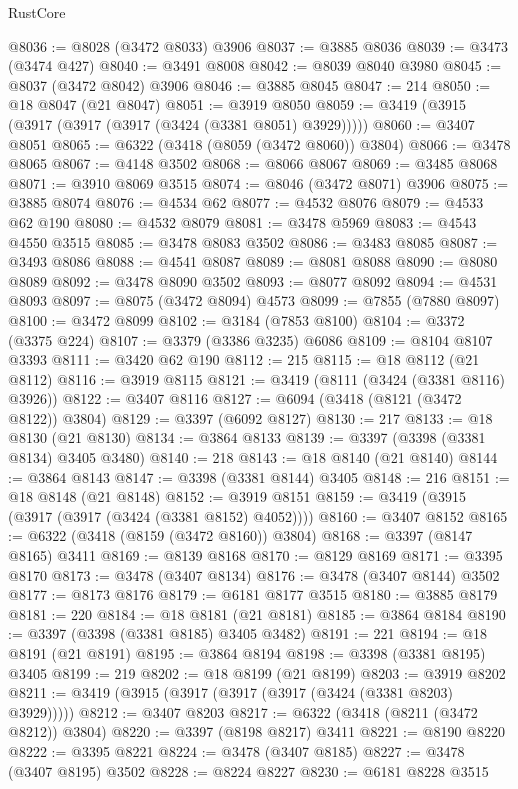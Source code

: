 \begin{lexlean}{RustCore}
\begin{coremodule}
@8036 := @8028 (@3472 @8033) @3906
@8037 := @3885 @8036
@8039 := @3473 (@3474 @427)
@8040 := @3491 @8008
@8042 := @8039 @8040 @3980
@8045 := @8037 (@3472 @8042) @3906
@8046 := @3885 @8045
@8047 := 214
@8050 := @18 @8047 (@21 @8047)
@8051 := @3919 @8050
@8059 := @3419 (@3915 (@3917 (@3917 (@3917 (@3424 (@3381 @8051) @3929)))))
@8060 := @3407 @8051
@8065 := @6322 (@3418 (@8059 (@3472 @8060)) @3804)
@8066 := @3478 @8065
@8067 := @4148 @3502
@8068 := @8066 @8067
@8069 := @3485 @8068
@8071 := @3910 @8069 @3515
@8074 := @8046 (@3472 @8071) @3906
@8075 := @3885 @8074
@8076 := @4534 @62
@8077 := @4532 @8076
@8079 := @4533 @62 @190
@8080 := @4532 @8079
@8081 := @3478 @5969
@8083 := @4543 @4550 @3515
@8085 := @3478 @8083 @3502
@8086 := @3483 @8085
@8087 := @3493 @8086
@8088 := @4541 @8087
@8089 := @8081 @8088
@8090 := @8080 @8089
@8092 := @3478 @8090 @3502
@8093 := @8077 @8092
@8094 := @4531 @8093
@8097 := @8075 (@3472 @8094) @4573
@8099 := @7855 (@7880 @8097)
@8100 := @3472 @8099
@8102 := @3184 (@7853 @8100)
@8104 := @3372 (@3375 @224)
@8107 := @3379 (@3386 @3235) @6086
@8109 := @8104 @8107 @3393
@8111 := @3420 @62 @190
@8112 := 215
@8115 := @18 @8112 (@21 @8112)
@8116 := @3919 @8115
@8121 := @3419 (@8111 (@3424 (@3381 @8116) @3926))
@8122 := @3407 @8116
@8127 := @6094 (@3418 (@8121 (@3472 @8122)) @3804)
@8129 := @3397 (@6092 @8127)
@8130 := 217
@8133 := @18 @8130 (@21 @8130)
@8134 := @3864 @8133
@8139 := @3397 (@3398 (@3381 @8134) @3405 @3480)
@8140 := 218
@8143 := @18 @8140 (@21 @8140)
@8144 := @3864 @8143
@8147 := @3398 (@3381 @8144) @3405
@8148 := 216
@8151 := @18 @8148 (@21 @8148)
@8152 := @3919 @8151
@8159 := @3419 (@3915 (@3917 (@3917 (@3424 (@3381 @8152) @4052))))
@8160 := @3407 @8152
@8165 := @6322 (@3418 (@8159 (@3472 @8160)) @3804)
@8168 := @3397 (@8147 @8165) @3411
@8169 := @8139 @8168
@8170 := @8129 @8169
@8171 := @3395 @8170
@8173 := @3478 (@3407 @8134)
@8176 := @3478 (@3407 @8144) @3502
@8177 := @8173 @8176
@8179 := @6181 @8177 @3515
@8180 := @3885 @8179
@8181 := 220
@8184 := @18 @8181 (@21 @8181)
@8185 := @3864 @8184
@8190 := @3397 (@3398 (@3381 @8185) @3405 @3482)
@8191 := 221
@8194 := @18 @8191 (@21 @8191)
@8195 := @3864 @8194
@8198 := @3398 (@3381 @8195) @3405
@8199 := 219
@8202 := @18 @8199 (@21 @8199)
@8203 := @3919 @8202
@8211 := @3419 (@3915 (@3917 (@3917 (@3917 (@3424 (@3381 @8203) @3929)))))
@8212 := @3407 @8203
@8217 := @6322 (@3418 (@8211 (@3472 @8212)) @3804)
@8220 := @3397 (@8198 @8217) @3411
@8221 := @8190 @8220
@8222 := @3395 @8221
@8224 := @3478 (@3407 @8185)
@8227 := @3478 (@3407 @8195) @3502
@8228 := @8224 @8227
@8230 := @6181 @8228 @3515

\end{coremodule}
\end{lexlean}
